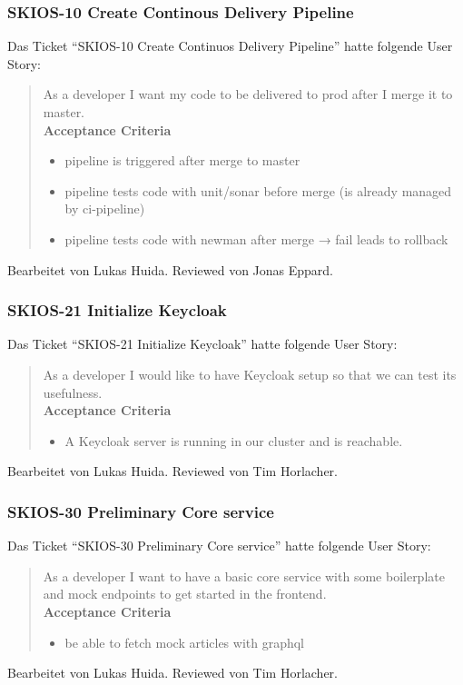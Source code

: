 \subsubsection{SKIOS-10 Create Continous Delivery Pipeline}
Das Ticket \enquote{SKIOS-10 Create Continuos Delivery Pipeline} hatte folgende User Story:
\begin{quotation}
    As a developer I want my code to be delivered to prod after I merge it to master. \\
    \textbf{Acceptance Criteria}
    \begin{itemize}
        \item pipeline is triggered after merge to master
        \item pipeline tests code with unit/sonar before merge (is already managed by ci-pipeline)
        \item pipeline tests code with newman after merge → fail leads to rollback
    \end{itemize}
\end{quotation}
Bearbeitet von Lukas Huida.
Reviewed von Jonas Eppard.

\subsubsection{SKIOS-21 Initialize Keycloak}
Das Ticket \enquote{SKIOS-21 Initialize Keycloak} hatte folgende User Story:
\begin{quotation}
    As a developer I would like to have Keycloak setup so that we can test its usefulness. \\
    \textbf{Acceptance Criteria}
    \begin{itemize}
        \item A Keycloak server is running in our cluster and is reachable.
    \end{itemize}
\end{quotation}
Bearbeitet von Lukas Huida.
Reviewed von Tim Horlacher.

\subsubsection{SKIOS-30 Preliminary Core service}
Das Ticket \enquote{SKIOS-30 Preliminary Core service} hatte folgende User Story:
\begin{quotation}
    As a developer I want to have a basic core service with some boilerplate and mock endpoints to get started in the frontend. \\
    \textbf{Acceptance Criteria}
    \begin{itemize}
        \item be able to fetch mock articles with graphql
    \end{itemize}
\end{quotation}
Bearbeitet von Lukas Huida.
Reviewed von Tim Horlacher.

